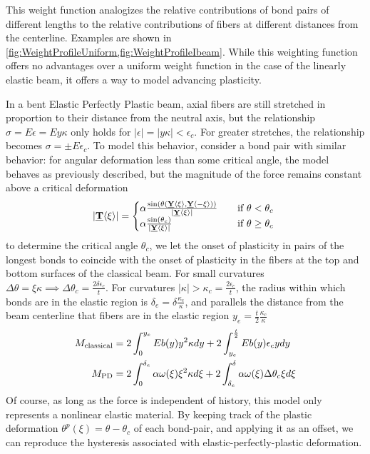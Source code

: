 \documentclass[11pt]{amsart}
\newcommand\vstate[3]{%
	\mathbf{\underline{#1}}%
	\ifstrempty{#2}{}{[#2]}%
	\ifstrempty{#3}{}{\langle #3 \rangle}}
\begin{document}
%
This weight function analogizes the relative contributions of bond pairs of different lengths to the relative contributions of fibers at different distances from the centerline. 
Examples are shown in \cref{fig:WeightProfileUniform,fig:WeightProfileIbeam}.
While this weighting function offers no advantages over a uniform weight function in the case of the linearly elastic beam, it offers a way to model advancing plasticity.

In a bent Elastic Perfectly Plastic beam, axial fibers are still stretched in proportion to their distance from the neutral axis, but the relationship \(\sigma = E\epsilon = Ey\kappa\) only holds for \(|\epsilon| = |y\kappa| < \epsilon_c\). 
For greater stretches, the relationship becomes \(\sigma = \pm E\epsilon_c \). 
To model this behavior, consider a bond pair with similar behavior: for angular deformation less than some critical angle, the model behaves as previously described, but the magnitude of the force remains constant above a critical deformation
%
\[ 
|\vstate{T}{}{\xi}| = 
  \begin{cases}
    \alpha \frac{\sin(\theta(\vstate{Y}{}{\xi},\vstate{Y}{}{\mathbf{-\xi}}))}{|\vstate{Y}{}{\xi}|} & \quad \text{if } \theta < \theta_c\\
    \alpha \frac{\sin(\theta_c)}{|\vstate{Y}{}{\xi}|} & \quad \text{if } \theta \geq \theta_c\
  \end{cases}
\]
%
to determine the critical angle \(\theta_c\), we let the onset of plasticity in pairs of the longest bonds to coincide with the onset of plasticity in the fibers at the top and bottom surfaces of the classical beam. 
For small curvatures \(\Delta\theta = \xi\kappa\implies\Delta\theta_c = \frac{2\delta\epsilon_c}{t}\). 
For curvatures \(|\kappa| > \kappa_c=\frac{2\epsilon_c}{t}\), the radius within which bonds are in the elastic region is \(\delta_e = \delta \frac{\kappa_c}{\kappa}\), and parallels the distance from the beam centerline that fibers are in the elastic region \(y_e = \frac{t}{2} \frac{\kappa_c}{\kappa}\)
%
\begin{align}
  M_\text{classical} &= 2 \int_{0}^{y_e}E b(y)y^2 \kappa dy +2 \int_{y_e}^{\frac{t}{2}}E b(y) \epsilon_c y dy\notag \\
  M_\text{PD} &= 2 \int_{0}^{\delta_e}\alpha \omega(\xi) \xi^2 \kappa d\xi +2 \int_{\delta_e}^{\delta}\alpha \omega(\xi) \Delta\theta_c \xi d\xi \notag
\end{align}
%
Of course, as long as the force is independent of history, this model only represents a nonlinear elastic material. 
By keeping track of the plastic deformation \(\theta^p (\xi) = \theta-\theta_c\) of each bond-pair, and applying it as an offset, we can reproduce the hysteresis associated with elastic-perfectly-plastic deformation.
%
%
\end{document}
